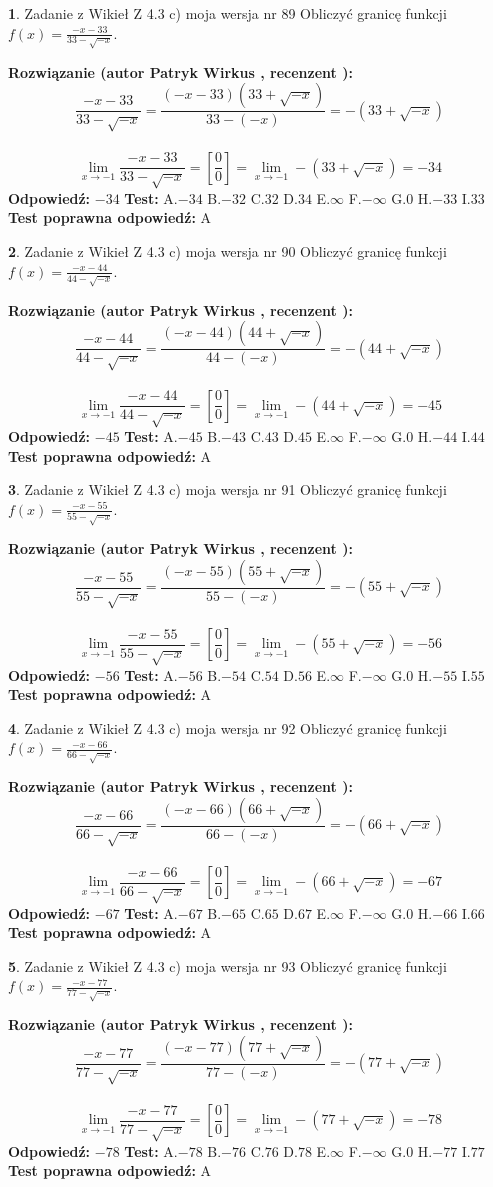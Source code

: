 \documentclass[12pt, a4paper]{article}
\theoremstyle{definition} %
\newtheorem{zad}{}
\newcommand{\zadStart}[1]{\begin{zad}#1\newline}
\newcommand{\zadStop}{\end{zad}}
\newcommand{\rozwStart}[2]{\noindent \textbf{Rozwiązanie (autor #1 , recenzent #2): }\newline}
\newcommand{\rozwStop}{\newline}
\newcommand{\odpStart}{\noindent \textbf{Odpowiedź:}\newline}
\newcommand{\odpStop}{\newline}
\newcommand{\testStart}{\noindent \textbf{Test:}\newline}
\newcommand{\testStop}{\newline}
\newcommand{\kluczStart}{\noindent \textbf{Test poprawna odpowiedź:}\newline}
\newcommand{\kluczStop}{\newline}
\begin{document}
\zadStart{Zadanie z Wikieł Z 4.3 c) moja wersja nr 89}
Obliczyć granicę funkcji $f(x)=\frac{-x-33}{33-\sqrt{-x}}$.
\zadStop
\rozwStart{Patryk Wirkus}{}
$$\frac{-x-33}{33-\sqrt{-x}}=\frac{(-x-33)(33+\sqrt{-x})}{33-(-x)}=-(33+\sqrt{-x})$$
\\
$$\lim\limits_{x\to-1}\frac{-x-33}{33-\sqrt{-x}}=[\frac{0}{0}]=\lim\limits_{x\to-1}-(33+\sqrt{-x}) =-34$$
\rozwStop
\odpStart
$-34$
\odpStop
\testStart
A.$-34$
B.$-32$
C.$32$
D.$34$
E.$\infty$
F.$-\infty$
G.$0$
H.$-33$
I.$33$
\testStop
\kluczStart
A
\kluczStop



\zadStart{Zadanie z Wikieł Z 4.3 c) moja wersja nr 90}
Obliczyć granicę funkcji $f(x)=\frac{-x-44}{44-\sqrt{-x}}$.
\zadStop
\rozwStart{Patryk Wirkus}{}
$$\frac{-x-44}{44-\sqrt{-x}}=\frac{(-x-44)(44+\sqrt{-x})}{44-(-x)}=-(44+\sqrt{-x})$$
\\
$$\lim\limits_{x\to-1}\frac{-x-44}{44-\sqrt{-x}}=[\frac{0}{0}]=\lim\limits_{x\to-1}-(44+\sqrt{-x}) =-45$$
\rozwStop
\odpStart
$-45$
\odpStop
\testStart
A.$-45$
B.$-43$
C.$43$
D.$45$
E.$\infty$
F.$-\infty$
G.$0$
H.$-44$
I.$44$
\testStop
\kluczStart
A
\kluczStop



\zadStart{Zadanie z Wikieł Z 4.3 c) moja wersja nr 91}
Obliczyć granicę funkcji $f(x)=\frac{-x-55}{55-\sqrt{-x}}$.
\zadStop
\rozwStart{Patryk Wirkus}{}
$$\frac{-x-55}{55-\sqrt{-x}}=\frac{(-x-55)(55+\sqrt{-x})}{55-(-x)}=-(55+\sqrt{-x})$$
\\
$$\lim\limits_{x\to-1}\frac{-x-55}{55-\sqrt{-x}}=[\frac{0}{0}]=\lim\limits_{x\to-1}-(55+\sqrt{-x}) =-56$$
\rozwStop
\odpStart
$-56$
\odpStop
\testStart
A.$-56$
B.$-54$
C.$54$
D.$56$
E.$\infty$
F.$-\infty$
G.$0$
H.$-55$
I.$55$
\testStop
\kluczStart
A
\kluczStop



\zadStart{Zadanie z Wikieł Z 4.3 c) moja wersja nr 92}
Obliczyć granicę funkcji $f(x)=\frac{-x-66}{66-\sqrt{-x}}$.
\zadStop
\rozwStart{Patryk Wirkus}{}
$$\frac{-x-66}{66-\sqrt{-x}}=\frac{(-x-66)(66+\sqrt{-x})}{66-(-x)}=-(66+\sqrt{-x})$$
\\
$$\lim\limits_{x\to-1}\frac{-x-66}{66-\sqrt{-x}}=[\frac{0}{0}]=\lim\limits_{x\to-1}-(66+\sqrt{-x}) =-67$$
\rozwStop
\odpStart
$-67$
\odpStop
\testStart
A.$-67$
B.$-65$
C.$65$
D.$67$
E.$\infty$
F.$-\infty$
G.$0$
H.$-66$
I.$66$
\testStop
\kluczStart
A
\kluczStop



\zadStart{Zadanie z Wikieł Z 4.3 c) moja wersja nr 93}
Obliczyć granicę funkcji $f(x)=\frac{-x-77}{77-\sqrt{-x}}$.
\zadStop
\rozwStart{Patryk Wirkus}{}
$$\frac{-x-77}{77-\sqrt{-x}}=\frac{(-x-77)(77+\sqrt{-x})}{77-(-x)}=-(77+\sqrt{-x})$$
\\
$$\lim\limits_{x\to-1}\frac{-x-77}{77-\sqrt{-x}}=[\frac{0}{0}]=\lim\limits_{x\to-1}-(77+\sqrt{-x}) =-78$$
\rozwStop
\odpStart
$-78$
\odpStop
\testStart
A.$-78$
B.$-76$
C.$76$
D.$78$
E.$\infty$
F.$-\infty$
G.$0$
H.$-77$
I.$77$
\testStop
\kluczStart
A
\kluczStop
\end{document}

